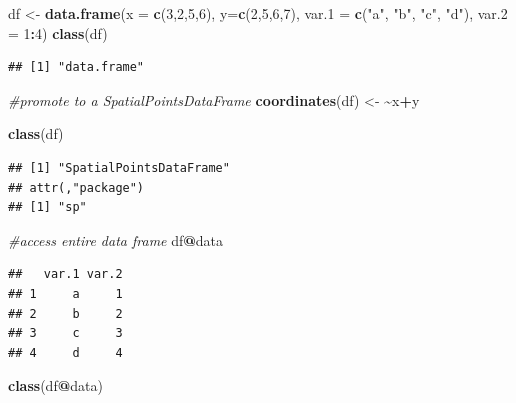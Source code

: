 \documentclass[
]{krantz}
\newenvironment{Shaded}{\begin{snugshade}}{\end{snugshade}}
\newcommand{\CommentTok}[1]{\textcolor[rgb]{0.56,0.35,0.01}{\textit{#1}}}
\newcommand{\DataTypeTok}[1]{\textcolor[rgb]{0.13,0.29,0.53}{#1}}
\newcommand{\DecValTok}[1]{\textcolor[rgb]{0.00,0.00,0.81}{#1}}
\newcommand{\ErrorTok}[1]{\textcolor[rgb]{0.64,0.00,0.00}{\textbf{#1}}}
\newcommand{\KeywordTok}[1]{\textcolor[rgb]{0.13,0.29,0.53}{\textbf{#1}}}
\newcommand{\NormalTok}[1]{#1}
\newcommand{\OperatorTok}[1]{\textcolor[rgb]{0.81,0.36,0.00}{\textbf{#1}}}
\newcommand{\StringTok}[1]{\textcolor[rgb]{0.31,0.60,0.02}{#1}}
\begin{document}
\begin{Shaded}
\begin{Highlighting}[]
\NormalTok{df \textless{}{-}}\StringTok{ }\KeywordTok{data.frame}\NormalTok{(}\DataTypeTok{x =} \KeywordTok{c}\NormalTok{(}\DecValTok{3}\NormalTok{,}\DecValTok{2}\NormalTok{,}\DecValTok{5}\NormalTok{,}\DecValTok{6}\NormalTok{), }
         \DataTypeTok{y=}\KeywordTok{c}\NormalTok{(}\DecValTok{2}\NormalTok{,}\DecValTok{5}\NormalTok{,}\DecValTok{6}\NormalTok{,}\DecValTok{7}\NormalTok{), }
         \DataTypeTok{var.1 =} \KeywordTok{c}\NormalTok{(}\StringTok{"a"}\NormalTok{, }\StringTok{"b"}\NormalTok{, }\StringTok{"c"}\NormalTok{, }\StringTok{"d"}\NormalTok{), }
         \DataTypeTok{var.2 =} \DecValTok{1}\OperatorTok{:}\DecValTok{4}\NormalTok{)}
\KeywordTok{class}\NormalTok{(df)}
\end{Highlighting}
\end{Shaded}

\begin{verbatim}
## [1] "data.frame"
\end{verbatim}

\begin{Shaded}
\begin{Highlighting}[]
\CommentTok{\#promote to a SpatialPointsDataFrame}
\KeywordTok{coordinates}\NormalTok{(df) \textless{}{-}}\StringTok{ }\ErrorTok{\textasciitilde{}}\NormalTok{x}\OperatorTok{+}\NormalTok{y}

\KeywordTok{class}\NormalTok{(df)}
\end{Highlighting}
\end{Shaded}

\begin{verbatim}
## [1] "SpatialPointsDataFrame"
## attr(,"package")
## [1] "sp"
\end{verbatim}

\begin{Shaded}
\begin{Highlighting}[]
\CommentTok{\#access entire data frame}
\NormalTok{df}\OperatorTok{@}\NormalTok{data}
\end{Highlighting}
\end{Shaded}

\begin{verbatim}
##   var.1 var.2
## 1     a     1
## 2     b     2
## 3     c     3
## 4     d     4
\end{verbatim}

\begin{Shaded}
\begin{Highlighting}[]
\KeywordTok{class}\NormalTok{(df}\OperatorTok{@}\NormalTok{data)}
\end{Highlighting}
\end{Shaded}
\end{document}
